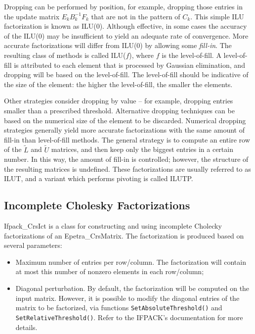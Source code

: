 Dropping can be performed
by position, for example, dropping those entries in the update matrix
$E_k B_k^{-1} F_k$ that are not in the pattern of $C_k$. 
This simple ILU factorization is known as ILU(0). Although effective, in
some cases the accuracy of the ILU(0) may be insufficient to yield an
adequate rate of convergence. More accurate factorizations will differ
from ILU(0) by allowing some {\em fill-in}. The resulting class of
methods is called ILU($f$), where $f$ is the level-of-fill. A
level-of-fill is attributed to each element that is processed by
Gaussian elimination, and dropping will be based on the level-of-fill.
The level-of-fill should be indicative of the size of the element: the
higher the level-of-fill, the smaller the elements.  

Other strategies consider dropping by value -- for example, dropping
entries smaller than a prescribed threshold. Alternative dropping
techniques can be based on the numerical size of the element to be
discarded. Numerical dropping strategies generally yield more accurate
factorizations with the same amount of fill-in than level-of-fill
methods. The general strategy is to compute an entire row of the
$\tilde{L}$ and $\tilde{U}$ matrices, and then keep only the biggest
entries in a certain number. In this way, the amount of fill-in is
controlled; however, the structure of the resulting matrices is
undefined. These factorizations are usually referred to as ILUT, and a
variant which performs pivoting is called ILUTP.


\subsection{Incomplete Cholesky Factorizations}
\label{sec:ifpack_chol}

Ifpack\_CrsIct is a class for constructing and using incomplete Cholecky
factorizations of an Epetra\_CrsMatrix. The factorization is produced
based on several parameters:
\begin{itemize}
\item Maximum number of entries per row/column. The factorization
  will contain at most this number of nonzero elements in each
  row/column;
\item Diagonal perturbation.  By default, the factorization will be
  computed on the input matrix. However, it is possible to modify the
  diagonal entries of the matrix to be factorized, via functions
  \verb!SetAbsoluteThreshold()! and \verb!SetRelativeThreshold()!. Refer
  to the IFPACK's documentation for more details.
\end{itemize}


